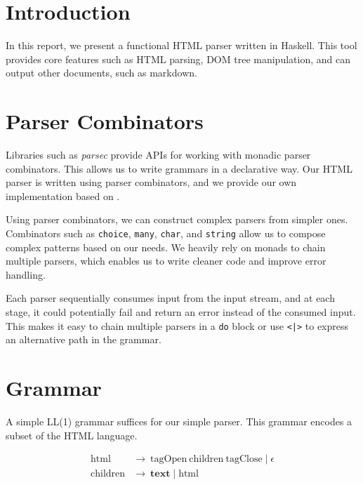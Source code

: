 \documentclass[12pt, a4paper]{article}
\begin{document}



\newpage
{}

\section{Introduction}

In this report, we present a functional HTML parser written in Haskell. This tool provides core features such as HTML parsing, DOM tree manipulation, and can output other documents, such as markdown.

\section{Parser Combinators}

Libraries such as \textit{parsec} provide APIs for working with monadic parser combinators. This allows us to write grammars in a declarative way. Our HTML parser is written using parser combinators, and we provide our own implementation based on \cite{parsec, combinatorshaskell}.

Using parser combinators, we can construct complex parsers from simpler ones. Combinators such as \texttt{choice}, \texttt{many}, \texttt{char}, and \texttt{string} allow us to compose complex patterns based on our needs. We heavily rely on monads to chain multiple parsers, which enables us to write cleaner code and improve error handling.

Each parser sequentially consumes input from the input stream, and at each stage, it could potentially fail and return an error instead of the consumed input. This makes it easy to chain multiple parsers in a \texttt{do} block or use \texttt{<|>} to express an alternative path in the grammar.

\section{Grammar}

A simple LL(1) grammar suffices for our simple parser. This grammar encodes a subset of the HTML language.

\[
    \begin{aligned}
        \text{html}     & \rightarrow \ \text{tagOpen}\ \text{children}\ \text{tagClose} \mid \epsilon \\
        \text{children} & \rightarrow \ \textbf{text} \mid \text{html}                                 \\
    \end{aligned}
\]
\end{document}
